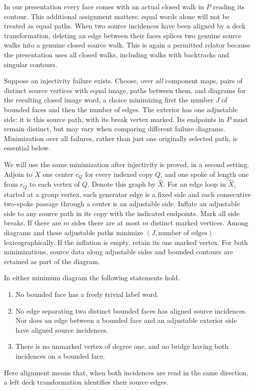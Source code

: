 In our presentation every face comes with an actual closed walk in $P$
reading its contour.  This additional assignment matters: equal words alone
will not be treated as equal paths.  When two source incidences have been
aligned by a deck transformation, deleting an edge between their faces
splices two genuine source walks into a genuine closed source walk.  This
is again a permitted relator because the presentation uses all closed
walks, including walks with backtracks and singular contours.

Suppose an injectivity failure exists.  Choose, over \emph{all} component
maps, pairs of distinct source vertices with equal image, paths between
them, and diagrams for the resulting closed image word, a choice minimizing
first the number $J$ of bounded faces and then the number of edges.  The
exterior has one adjustable side: it is this source path, with its break
vertex marked.  Its endpoints in $P$ must remain distinct, but may vary
when comparing different failure diagrams.  Minimization over all failures,
rather than just one originally selected path, is essential below.

We will use the same minimization after injectivity is proved, in a second
setting.  Adjoin to $X$ one center $c_Q$ for every indexed copy $Q$, and one
spoke of length one from $c_Q$ to each vertex of $Q$.  Denote this graph
by $\widehat X$.  For an edge loop in $\widehat X$, started at a group
vertex, each generator edge is a fixed side and each consecutive two-spoke
passage through a center is an adjustable side.  Inflate an adjustable
side to any source path in its copy with the indicated endpoints.  Mark
all side breaks.  If there are $m$ sides there are at most $m$ distinct
marked vertices.  Among diagrams and these adjustable paths minimize
$(J,\text{number of edges})$ lexicographically.  If the inflation is empty,
retain its one marked vertex.  For both minimizations, source data along
adjustable sides and bounded contours are retained as part of the diagram.

\begin{lemma}
\label{geo:reductions}
In either minimum diagram the following statements hold.
\begin{enumerate}
 \item No bounded face has a freely trivial label word.
 \item No edge separating two distinct bounded faces has aligned source
 incidences.  Nor does an edge between a bounded face and an adjustable
 exterior side have aligned source incidences.
 \item There is no unmarked vertex of degree one, and no bridge having
 both incidences on a bounded face.
\end{enumerate}
Here alignment means that, when both incidences are read in the same
direction, a left deck transformation identifies their source edges.
\end{lemma}

